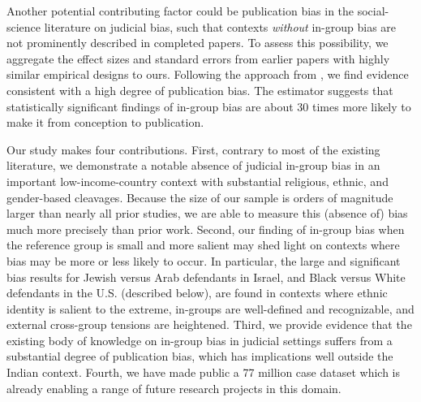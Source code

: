 \documentclass[12pt,english]{article}
\begin{document}
Another potential contributing factor could be publication bias in the social-science literature on judicial bias, such that contexts \textit{without} in-group bias are not prominently described in completed papers. To assess this possibility, we aggregate the effect sizes and standard errors from earlier papers with highly similar empirical designs to ours. Following the approach from \cite{andrews2019bias}, we find evidence consistent with a high degree of publication bias. The \citet{andrews2019bias} estimator suggests that statistically significant findings of in-group bias are about 30 times more likely to make it from conception to publication.

Our study makes four contributions. First, contrary to most of the existing literature, we demonstrate a notable absence of judicial in-group bias in an important low-income-country context with substantial religious, ethnic, and gender-based cleavages. Because the size of our sample is orders of magnitude larger than nearly all prior studies, we are able to measure this (absence of) bias much more precisely than prior work. Second, our finding of in-group bias when the reference group is small and more salient may shed light on contexts where bias may be more or less likely to occur. In particular, the large and significant bias results for Jewish versus Arab defendants in Israel, and Black versus White defendants in the U.S. (described below), are found in contexts where ethnic identity is salient to the extreme, in-groups are well-defined and recognizable, and external cross-group tensions are heightened. Third, we provide evidence that the existing body of knowledge on in-group bias in judicial settings suffers from a substantial degree of publication bias, which has implications well outside the Indian context. Fourth, we have made public a 77 million case dataset which is already enabling a range of future research projects in this domain.
\end{document}
